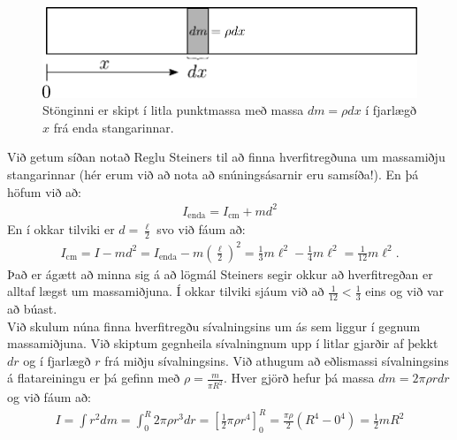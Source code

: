 \ifdefined \wholebook \else\documentclass[oneside]{book}\usepackage{EdlBook}\graphicspath{{figures/}}
\begin{document}
\begin{figure}[H]
    \centering
    \includegraphics[scale=0.5]{momentsOfInertia/stongendi.pdf}
    \caption{Stönginni er skipt í litla punktmassa með massa $dm = \rho dx$ í fjarlægð $x$ frá enda stangarinnar.}
\end{figure}
Við getum síðan notað Reglu Steiners til að finna hverfitregðuna um massamiðju stangarinnar (hér erum við að nota að snúningsásarnir eru samsíða!). En þá höfum við að:
\begin{align*}
    I_{\text{enda}} = I_{\text{cm}} + md^2
\end{align*}
En í okkar tilviki er $d = \frac{\ell}{2}$ svo við fáum að:
\begin{align*}
    I_{\text{cm}} = I - md^2  = I_{\text{enda}} - m\left( \frac{\ell}{2} \right)^2 = \frac{1}{3}m\ell^2 - \frac{1}{4}m\ell^2 = \frac{1}{12}m\ell^2.
\end{align*}
Það er ágætt að minna sig á að lögmál Steiners segir okkur að hverfitregðan er alltaf lægst um massamiðjuna. Í okkar tilviki sjáum við að $\frac{1}{12} < \frac{1}{3}$ eins og við var að búast. \\

Við skulum núna finna hverfitregðu sívalningsins um ás sem liggur í gegnum massamiðjuna. Við skiptum gegnheila sívalningnum upp í litlar gjarðir af þekkt $dr$ og í fjarlægð $r$ frá miðju sívalningsins. Við athugum að eðlismassi sívalningsins á flatareiningu er þá gefinn með $\rho = \frac{m}{\pi R^2}$. Hver gjörð hefur þá massa $dm = 2\pi \rho r dr$ og við fáum að:
\begin{align*}
    I = \int r^2 dm = \int_{0}^{R} 2\pi \rho r^3 dr = \left[ \frac{1}{2}\pi \rho r^4  \right]_{0}^{R} = \frac{\pi \rho}{2}\left(R^4 - 0^4 \right) = \frac{1}{2}mR^2
\end{align*}
\end{document}
